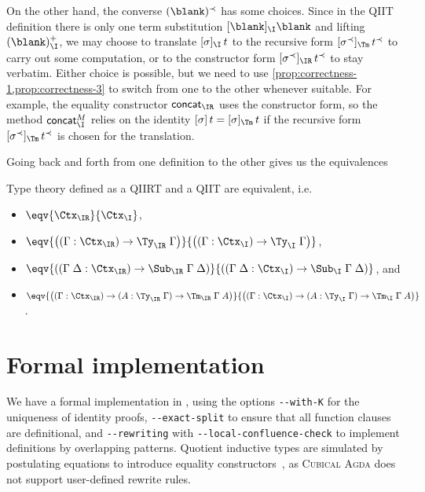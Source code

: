 \documentclass[a4paper,UKenglish,numberwithinsect,cleveref,thm-restate]{lipics-v2021}
\newcommand{\Fredrik}[2][]{\todo[inline,author={Fred},caption={},#1]{#2}}
\begin{document}
On the other hand, the converse $(\blank)^{\prec}$ has some choices.
Since in the QIIT definition there is only one term substitution $[\blank]_{\I}\blank$ and lifting $(\blank)^+_{\I}$, we may choose to translate $[\sigma]_{\I} \,t$ to the recursive form $[\sigma^{\prec}]_{\Tm}\,t^{\prec}$ to carry out some computation, or to the constructor form $[\sigma^{\prec}]_{\IR}\,t^{\prec}$ to stay verbatim.
Either choice is possible, but we need to use \cref{prop:correctness-1,prop:correctness-3} to switch from one to the other whenever suitable.
For example, the equality constructor $\mathsf{concat}_{\IR}$ uses the constructor form, so the method $\mathsf{concat}^M_{\I}$ relies on the identity $[ \sigma ]\,t = [\sigma]_{\Tm}\,t$ if the recursive form $[\sigma^{\prec}]_{\Tm}\,t^{\prec}$ is chosen for the translation.

Going back and forth from one definition to the other gives us the equivalences
\begin{theorem}
  Type theory defined as a QIIRT and a QIIT are equivalent, i.e.\ 
  \begin{itemize}
    \item $\eqv{\Ctx_{\IR}}{\Ctx_{\I}}$, 
    \item $\eqv{\left((\Gamma : \Ctx_{\IR})\to\Ty_{\IR}\;\Gamma\right)}{\left((\Gamma : \Ctx_{\I})\to\Ty_{\I}\;\Gamma\right)}$,
    \item $\eqv{\left((\Gamma\;\Delta : \Ctx_{\IR}) \to \Sub_{\IR}\;\Gamma\;\Delta\right)}%
               {\left((\Gamma\;\Delta: \Ctx_{\I}) \to \Sub_{\I}\;\Gamma\;\Delta\right)}$, and 
    \item $\eqv{\left((\Gamma : \Ctx_{\IR}) \to (A : \Ty_{\IR}\;\Gamma) \to \Tm_{\IR}\;\Gamma\;A\right)}
               {\left((\Gamma : \Ctx_{\I}) \to (A : \Ty_{\I}\;\Gamma) \to \Tm_{\I}\;\Gamma\;A\right)}$.
  \end{itemize}
\end{theorem}

\section{Formal implementation} \label{sec:formal-implementation}

We have a formal implementation in \Agda, using the options \texttt{-{}-with-K} for the uniqueness of identity proofs, \texttt{-{}-exact-split} to ensure that all function clauses are definitional, and \texttt{-{}-rewriting} with \texttt{-{}-local-confluence-check} \cite{Cockx2020,Cockx2021} to implement definitions by overlapping patterns.
Quotient inductive types are simulated by postulating equations to introduce equality constructors~\cite{Licata2011}, as \textsc{Cubical Agda} does not support user-defined rewrite rules.
\end{document}

